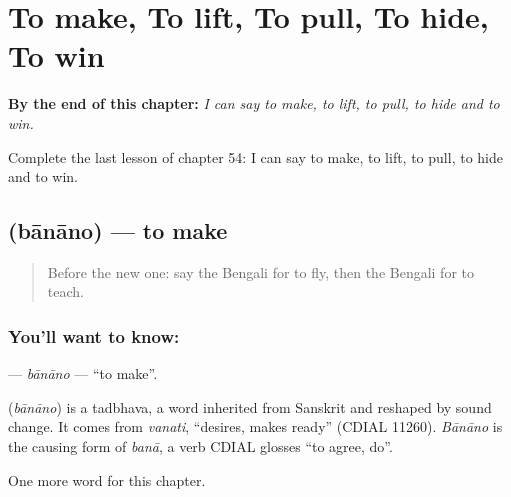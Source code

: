 
\chapter{To make, To lift, To pull, To hide, To win}
\label{ch:bn-to-make-to-lift-to-pull-to-hide-to-win}

\begin{chapteropening}
\textbf{By the end of this chapter:} \emph{I can say to make, to lift, to pull, to hide and to win.}

Complete the last lesson of chapter 54: I can say to make, to lift, to pull, to hide and to win.
\end{chapteropening}

\section[\texorpdfstring{\bn{বানানো} (bānāno)}{বানানো (bānāno)}]{ (bānāno) — to make}

\label{lesson:BN-C54-banano}



\begin{quote}
Before the new one: say the Bengali for to fly, then the Bengali for to teach.
\end{quote}

\subsection*{You'll want to know: }
\textbf{} — \emph{bānāno} — \textquotedblleft{}to make\textquotedblright{}.

\begin{cousinweb}
\textbf{} (\emph{bānāno}) is a tadbhava, a word inherited from Sanskrit and reshaped by sound change. It comes from \emph{vanati}, \textquotedblleft{}desires, makes ready\textquotedblright{} (CDIAL 11260). \emph{Bānāno} is the causing form of \emph{banā}, a verb CDIAL glosses \textquotedblleft{}to agree, do\textquotedblright{}.
\end{cousinweb}

\begin{grammarlens}[title={What you've built}]
One more word for this chapter.
\end{grammarlens}

